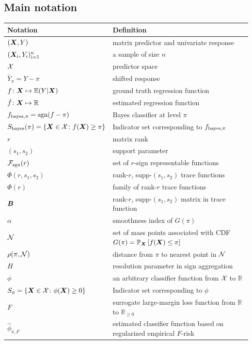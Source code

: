 \documentclass[11pt]{article}
\theoremstyle{plain}
\theoremstyle{definition}
\def\caliF{\tF_{\textup{sgn}}}
\def\sign{\textup{sgn}}
\def\bayesS{S_{\textup{bayes}}}
\def\bayespif{f_{\textup{bayes},\pi}}
\def\caliF{\tF_{\textup{sgn}}}
\def\shift{\bar Y_\pi}
\begin{document}
\subsection{Main notation}
\begin{table}[ht]
\begin{tabular}{l|l}
Notation & Definition \\
\hline
$(\bm X,Y)$ & matrix predictor and univariate response\\ 
$(\bm X_i,Y_i)_{i=1}^n$ & a sample of size $n$\\
$\mathcal{X}$ & predictor space \\
$\shift=Y-\pi$ & shifted response\\
$f\colon \bm X\mapsto \mathbb{E}(Y|\bm X)$ & ground truth regression function \\
$\hat f\colon \bm X\mapsto \mathbb{R}$ & estimated regression function \\
$\bayespif=\sign(f-\pi)$ & Bayes classifier at level $\pi$\\
$\bayesS(\pi)=\{\mX\in\tX\colon f(\mX)\geq \pi\}$ & Indicator set corresponding to $\bayespif$\\
$r$& matrix rank\\
$(s_1,s_2)$ & support parameter \\
$\caliF(r)$ & set of $r$-sign representable functions\\
$\Phi(r,s_1,s_2)$ & rank-$r$, supp-$(s_1,s_2)$ trace functions\\
$\Phi(r)$ & family of rank-$r$ trace functions\\
$\bm B$ & rank-$r$, supp-$(s_1,s_2)$ matrix in trace function\\
$\alpha$ & smoothness index of $G(\pi)$\\
$\mathcal{N}$ & set of mass points associated with CDF $G(\pi)=\mathbb{P}_{\bm X}\left[f(\bm X)\leq \pi\right]$ \\
$\rho(\pi,\mathcal{N})$ & distance from $\pi$ to nearest point in $\mathcal{N}$\\
$H$ & resolution parameter in sign aggregation \\
$\phi$ & an arbitrary classifier function from $\mathcal{X}$ to $\mathbb{R}$\\
$S_{\phi} = \{\bm X\in\mathcal{X}\colon \phi(\bm X)\geq 0\}$ & Indicator set corresponding to $\phi$\\
$F$ & surrogate large-margin loss function from $\mathbb{R}$ to $\mathbb{R}_{\geq 0}$\\
$\hat \phi_{\pi,F}$ & estimated classifier function based on regularized empirical $F$-risk\\

\end{tabular}
\end{table}
\end{document}
